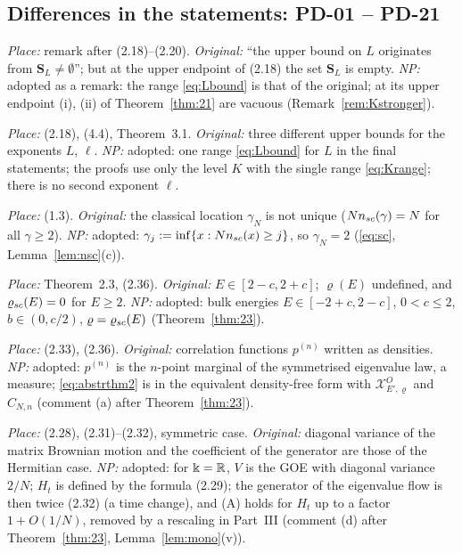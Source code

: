 \subsection{Differences in the statements: PD-01 -- PD-21}\label{app:diffPD}
\begin{description}[leftmargin=1.5em,itemsep=3pt,font=\normalfont\bfseries]
\item[PD-01] \emph{Place:} remark after (2.18)--(2.20). \emph{Original:} ``the upper bound on $L$ originates from $\mathbf S_L\ne\emptyset$''; but at the upper endpoint of (2.18) the set $\mathbf S_L$ is empty. \emph{NP:} adopted as a remark: the range \eqref{eq:Lbound} is that of the original; at its upper endpoint (i), (ii) of Theorem~\ref{thm:21} are vacuous (Remark~\ref{rem:Kstronger}).
\item[PD-02] \emph{Place:} (2.18), (4.4), Theorem~3.1. \emph{Original:} three different upper bounds for the exponents $L$, $\ell$. \emph{NP:} adopted: one range \eqref{eq:Lbound} for $L$ in the final statements; the proofs use only the level $K$ with the single range \eqref{eq:Krange}; there is no second exponent $\ell$.
\item[PD-03] \emph{Place:} (1.3). \emph{Original:} the classical location $\gamma_N$ is not unique ($Nn_{sc}(\gamma)=N$ for all $\gamma\ge2$). \emph{NP:} adopted: $\gamma_j:=\inf\{x:Nn_{sc}(x)\ge j\}$, so $\gamma_N=2$ (\eqref{eq:sc}, Lemma~\ref{lem:nsc}(c)).
\item[PD-04] \emph{Place:} Theorem~2.3, (2.36). \emph{Original:} $E\in[2-c,2+c]$; $\varrho(E)$ undefined, and $\varrho_{sc}(E)=0$ for $E\ge2$. \emph{NP:} adopted: bulk energies $E\in[-2+c,2-c]$, $0<c\le2$, $b\in(0,c/2)$, $\varrho=\varrho_{sc}(E)$ (Theorem~\ref{thm:23}).
\item[PD-05] \emph{Place:} (2.33), (2.36). \emph{Original:} correlation functions $p^{(n)}$ written as densities. \emph{NP:} adopted: $p^{(n)}$ is the $n$-point marginal of the symmetrised eigenvalue law, a measure; \eqref{eq:abstrthm2} is in the equivalent density-free form with $\mathcal X^O_{E',\varrho}$ and $C_{N,n}$ (comment (a) after Theorem~\ref{thm:23}).
\item[PD-06] \emph{Place:} (2.28), (2.31)--(2.32), symmetric case. \emph{Original:} diagonal variance of the matrix Brownian motion and the coefficient of the generator are those of the Hermitian case. \emph{NP:} adopted: for $\Bbbk=\mathbb{R}$, $V$ is the GOE with diagonal variance $2/N$; $H_t$ is defined by the formula (2.29); the generator of the eigenvalue flow is then twice (2.32) (a time change), and (A) holds for $H_t$ up to a factor $1+O(1/N)$, removed by a rescaling in Part~III (comment (d) after Theorem~\ref{thm:23}, Lemma~\ref{lem:mono}(v)).

\end{description}

